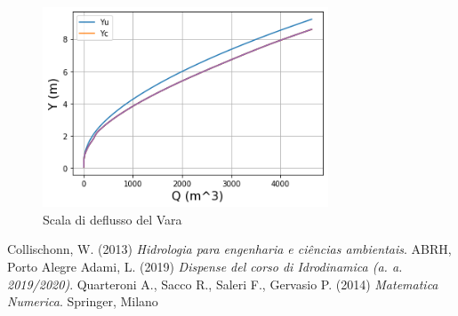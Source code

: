 \documentclass[12pt]{article} %
\begin{document}
\begin{figure} [H]
    \centering
    \includegraphics[width=8.5cm]{deflussova.png}
    \caption{Scala di deflusso del Vara}
    \label{fig:Vara_scala_deflusso}
\end{figure}

\newpage

\begin{thebibliography}{}
Collischonn, W. (2013) \textit{Hidrologia para engenharia e ciências ambientais}. ABRH, Porto Alegre
Adami, L. (2019) \textit{Dispense del corso di Idrodinamica (a. a. 2019/2020)}.
Quarteroni A., Sacco R., Saleri F., Gervasio P. (2014) \textit{Matematica Numerica}. Springer, Milano
\end{thebibliography}
\end{document}
